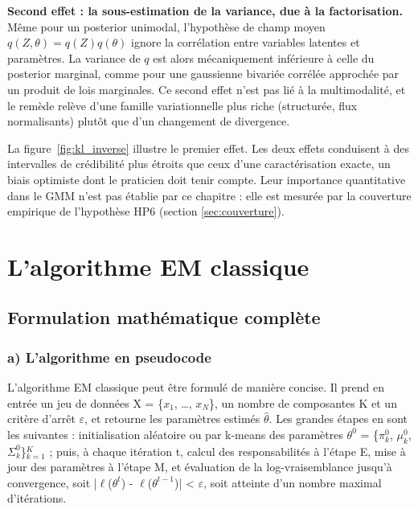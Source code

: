 \textbf{Second effet : la sous-estimation de la variance, due à la factorisation. }Même pour un posterior unimodal, l'hypothèse de champ moyen $q(Z, \theta) = q(Z)q(\theta)$ ignore la corrélation entre variables latentes et paramètres. La variance de $q$ est alors mécaniquement inférieure à celle du posterior marginal, comme pour une gaussienne bivariée corrélée approchée par un produit de lois marginales. Ce second effet n'est pas lié à la multimodalité, et le remède relève d'une famille variationnelle plus riche (structurée, flux normalisants) plutôt que d'un changement de divergence.

La figure~\ref{fig:kl_inverse} illustre le premier effet. Les deux effets conduisent à des intervalles de crédibilité plus étroits que ceux d'une caractérisation exacte, un biais optimiste dont le praticien doit tenir compte. Leur importance quantitative dans le GMM n'est pas établie par ce chapitre : elle est mesurée par la couverture empirique de l'hypothèse HP6 (section \ref{sec:couverture}).



\section{L'algorithme EM classique}\label{sec:em_classique}
\subsection{Formulation mathématique complète}\label{sec:formulation_mathematique_complete}
\subsubsection{a) L'algorithme en pseudocode}\label{sec:a_l_algorithme_en_pseudocode}
L'algorithme EM classique peut être formulé de manière concise. Il prend en entrée un jeu de données X = \{$x_{1}$, \ldots{}, $x_{N}$\}, un nombre de composantes K et un critère d'arrêt $\varepsilon $, et retourne les paramètres estimés $\hat{\theta }$. Les grandes étapes en sont les suivantes : initialisation aléatoire ou par k-means des paramètres $\theta ^{0}$ = \{$\pi _{k}^{0}$, $\mu _{k}^{0}$, $\Sigma _{k}^{0}$\}$_{k=1}^{K}$ ; puis, à chaque itération t, calcul des responsabilités à l'étape E, mise à jour des paramètres à l'étape M, et évaluation de la log-vraisemblance jusqu'à convergence, soit |$\ell $($\theta ^{t}$) - $\ell $($\theta ^{t-1}$)| < $\varepsilon $, soit atteinte d'un nombre maximal d'itérations.

